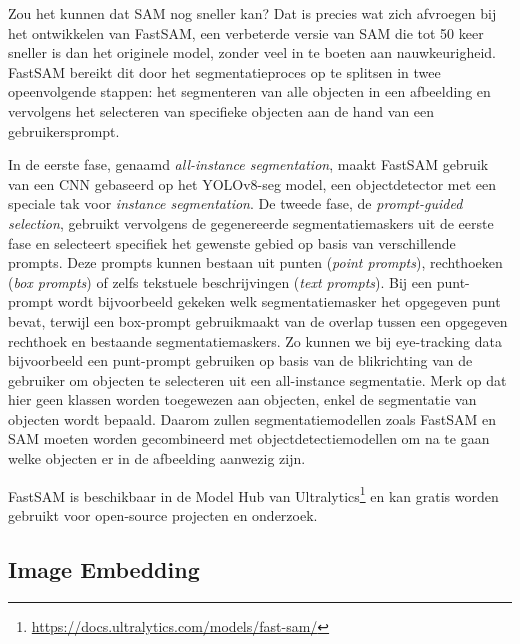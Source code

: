 Zou het kunnen dat SAM nog sneller kan? 
Dat is precies wat \textcite{Zhao2023} zich afvroegen bij het ontwikkelen van FastSAM, een verbeterde versie van SAM die tot 50 keer sneller is dan het originele model, zonder veel in te boeten aan nauwkeurigheid.
FastSAM bereikt dit door het segmentatieproces op te splitsen in twee opeenvolgende stappen: het segmenteren van alle objecten in een afbeelding en vervolgens het selecteren van specifieke objecten aan de hand van een gebruikersprompt.
\newline \par
In de eerste fase, genaamd \textit{all-instance segmentation}, maakt FastSAM gebruik van een CNN gebaseerd op het YOLOv8-seg model, een objectdetector met een speciale tak voor \textit{instance segmentation}. 
De tweede fase, de \textit{prompt-guided selection}, gebruikt vervolgens de gegenereerde segmentatiemaskers uit de eerste fase en selecteert specifiek het gewenste gebied op basis van verschillende prompts. 
Deze prompts kunnen bestaan uit punten (\textit{point prompts}), rechthoeken (\textit{box prompts}) of zelfs tekstuele beschrijvingen (\textit{text prompts}). 
Bij een punt-prompt wordt bijvoorbeeld gekeken welk segmentatiemasker het opgegeven punt bevat, terwijl een box-prompt gebruikmaakt van de overlap tussen een opgegeven rechthoek en bestaande segmentatiemaskers.
Zo kunnen we bij eye-tracking data bijvoorbeeld een punt-prompt gebruiken op basis van de blikrichting van de gebruiker om objecten te selecteren uit een all-instance segmentatie.
Merk op dat hier geen klassen worden toegewezen aan objecten, enkel de segmentatie van objecten wordt bepaald. 
Daarom zullen segmentatiemodellen zoals FastSAM en SAM moeten worden gecombineerd met objectdetectiemodellen om na te gaan welke objecten er in de afbeelding aanwezig zijn.
\newline \par
FastSAM is beschikbaar in de Model Hub van Ultralytics\footnote{\url{https://docs.ultralytics.com/models/fast-sam/}} en kan gratis worden gebruikt voor open-source projecten en onderzoek.

\subsection{Image Embedding}

